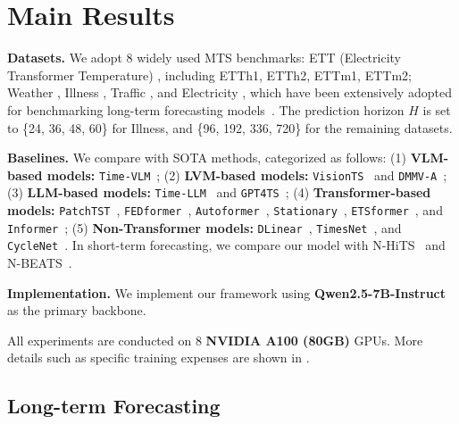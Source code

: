 \section{Main Results}




\noindent \textbf{Datasets.} We adopt 8 widely used MTS benchmarks: ETT (Electricity Transformer Temperature) \cite{zhou2021informer}, including ETTh1, ETTh2, ETTm1, ETTm2; Weather \cite{wu2021autoformer}, Illness \cite{wu2021autoformer}, Traffic \cite{wu2021autoformer}, and Electricity \cite{electricity}, which have been extensively adopted for benchmarking long-term forecasting models~\citep{wu2022timesnet}.
The prediction horizon $H$ is set to \{24, 36, 48, 60\} for Illness, and \{96, 192, 336, 720\} for the remaining datasets.

\noindent \textbf{Baselines.} We compare \method{} with SOTA methods, categorized as follows:
(1) \textbf{VLM-based models:} \texttt{Time-VLM}~\cite{zhong2025time};
(2) \textbf{LVM-based models:} \texttt{VisionTS}~\cite{chen2024visionts} and \texttt{DMMV-A}~\cite{shen2025dmmv};
(3) \textbf{LLM-based models:} \texttt{Time-LLM}~\cite{jin2024timellm} and \texttt{GPT4TS}~\cite{zhou2023one};
(4) \textbf{Transformer-based models:} \texttt{PatchTST}~\cite{nie2022time}, \texttt{FEDformer}~\cite{zhou2022fedformer}, \texttt{Autoformer}~\cite{wu2021autoformer}, \texttt{Stationary}~\cite{liu2022non}, \texttt{ETSformer}~\cite{woo2022etsformer}, and \texttt{Informer}~\cite{zhou2021informer};
(5) \textbf{Non-Transformer models:} \texttt{DLinear}~\cite{zeng2023transformers}, \texttt{TimesNet}~\cite{wu2022timesnet}, and \texttt{CycleNet}~\cite{lin2024cyclenet}.
In short-term forecasting, we compare our model with N-HiTS~\cite{challu2023nhits} and N-BEATS~\cite{oreshkin2019n}.

\noindent \textbf{Implementation.} We implement our framework using \textbf{Qwen2.5-7B-Instruct}~\citep{qwen2.5} as the primary backbone.

All experiments are conducted on 8 \textbf{NVIDIA A100 (80GB)} GPUs. More details such as specific training expenses are shown in .

\subsection{Long-term Forecasting} \label{sec:long-term-forecasting}

